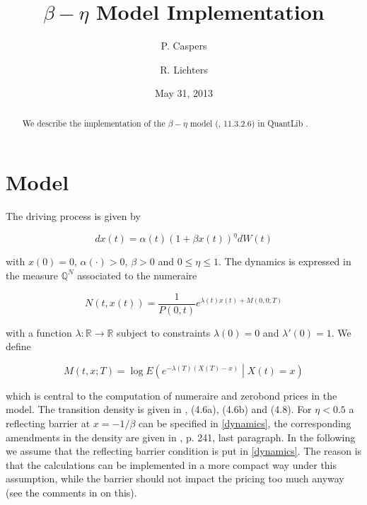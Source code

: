 \documentclass{amsart}
\theoremstyle{plain}
\numberwithin{equation}{section}
\begin{document}
\title[$\beta-\eta$ Model Implementation]{$\beta-\eta$ Model Implementation}
\author{P. Caspers}
\author{R. Lichters}
\date{May 31, 2013}
\begin{abstract}
We describe the implementation of the $\beta-\eta$ model (\cite{betaeta}, \cite{piterbarg} 11.3.2.6) in QuantLib \cite{ql}.
\end{abstract}

\maketitle

\tableofcontents

\section{Model}

The driving process is given by

\begin{equation}\label{dynamics}
dx(t) = \alpha(t) ( 1 + \beta x(t) )^\eta dW(t) 
\end{equation}

with $x(0)=0$, $\alpha(\cdot) > 0$, $\beta > 0$ and $0 \leq \eta \leq 1$. The dynamics is expressed in the measure $\mathbb{Q}^N$ associated to the numeraire

\begin{equation}
N(t,x(t)) = \frac{1}{P(0,t)}e^{\lambda(t)x(t)+M(0,0;T)}
\end{equation}

with a function $\lambda: \mathbb{R}\rightarrow\mathbb{R}$ subject to constraints $\lambda(0)=0$ and $\lambda'(0)=1$. We define

\begin{equation}\label{formula_M}
M(t,x;T) = \log E \left( e^{-\lambda(T)(X(T)-x)} \middle | X(t)=x \right)
\end{equation}

which is central to the computation of numeraire and zerobond prices in the model. The transition density is given in \cite{betaeta}, (4.6a), (4.6b) and (4.8). For $\eta < 0.5$ a reflecting barrier at $x=-1/\beta$ can be specified in \ref{dynamics}, the corresponding amendments in the density are given in \cite{betaeta}, p. 241, last paragraph. In the following we assume that the reflecting barrier condition is put in \ref{dynamics}. The reason is that the calculations can be implemented in a more compact way under this assumption, while the barrier should not impact the pricing too much anyway (see the comments in \cite{betaeta} on this). 
\end{document}
